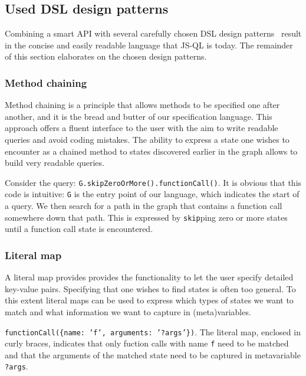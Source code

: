 \subsection*{Used DSL design patterns}

Combining a smart API with several carefully chosen DSL design patterns~\cite{DSLFowler} result in the concise and easily readable language that JS-QL is today. The remainder of this section elaborates on the chosen design patterns.

\subsubsection*{Method chaining}

Method chaining is a principle that allows methods to be specified one after another, and it is the bread and butter of our specification language. This approach offers a fluent interface to the user with the aim to write readable queries and avoid coding mistakes. The ability to express a state one wishes to encounter as a chained method to states discovered earlier in the graph allows to build very readable queries.
\begin{exmp}
\label{ex:fluentInterface}
 Consider the query: \texttt{G.skipZeroOrMore().functionCall()}. It is obvious that this code is intuitive: \texttt{G} is the entry point of our language, which indicates the start of a query. We then search for a path in the graph that contains a function call somewhere down that path. This is expressed by \texttt{skip}ping zero or more states until a function call state is encountered.
\end{exmp}

\subsubsection*{Literal map}
A literal map provides provides the functionality to let the user specify detailed key-value pairs.
Specifying that one wishes to find states is often too general. To this extent literal maps can be used to express which types of states we want to match and what information we want to capture in (meta)variables. 
\begin{exmp}
\label{ex:literalMap}
\texttt{functionCall(\{name: 'f', arguments: '?args'\})}. The literal map, enclosed in curly braces, indicates that only fuction calls with name \texttt{f} need to be matched and that the arguments of the matched state need to be captured in metavariable \texttt{?args}.
\end{exmp}

